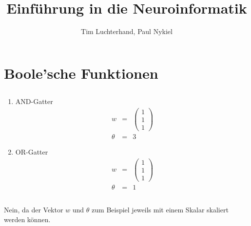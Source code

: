 \documentclass[DIN, pagenumber=false, fontsize=11pt, parskip=half]{scrartcl}
\title{Einführung in die Neuroinformatik}
\author{Tim Luchterhand, Paul Nykiel}
\begin{document}
    \maketitle
    \section{Boole'sche Funktionen}
    \subsection{}
    \begin{enumerate}[label = (\alph*)]
        \item AND-Gatter
            \begin{eqnarray*}
                w &=& \begin{pmatrix}
                    1 \\ 1 \\ 1
                \end{pmatrix} \\
                \theta &=& 3
            \end{eqnarray*}
        \item OR-Gatter
            \begin{eqnarray*}
                w &=& \begin{pmatrix}
                    1 \\ 1 \\ 1
                \end{pmatrix} \\
                \theta &=& 1
            \end{eqnarray*}
    \end{enumerate}
    \subsection{}
    Nein, da der Vektor $w$ und $\theta$ zum Beispiel jeweils mit einem Skalar skaliert werden können.
\end{document}
